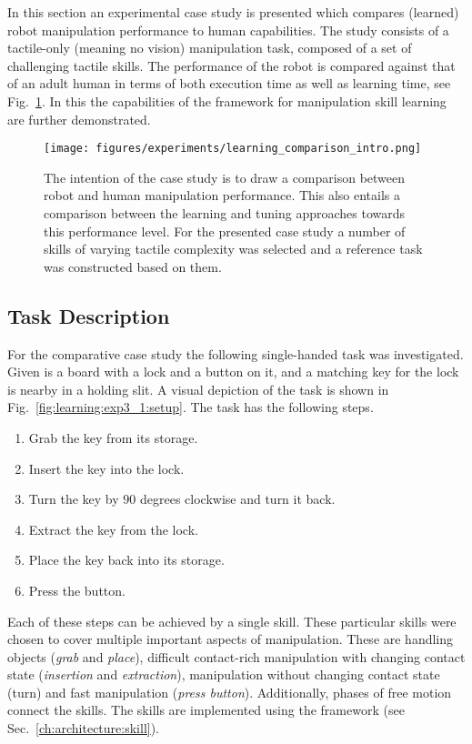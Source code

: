 In this section an experimental case study is presented which compares (learned) robot manipulation performance to human capabilities.
The study consists of a tactile-only (meaning no vision) manipulation task, composed of a set of challenging tactile skills.
The performance of the robot is compared against that of an adult human in terms of both execution time as well as learning time, see Fig.~\ref{fig:learning:comparison_intro}.
In this the capabilities of the \skillmodelabbr{} framework for manipulation skill learning are further demonstrated.

\begin{figure}[ht!]
\texttt{[image: figures/experiments/learning\_comparison\_intro.png]}
\caption{The intention of the case study is to draw a comparison between robot and human manipulation performance.
This also entails a comparison between the learning and tuning approaches towards this performance level.
For the presented case study a number of skills of varying tactile complexity was selected and a reference task was constructed based on them.}
\label{fig:learning:comparison_intro}
\end{figure}

\subsection{Task Description}\label{ch:learning:comparison:task}

For the comparative case study the following single-handed task was investigated.
Given is a board with a lock and a button on it, and a matching key for the lock is nearby in a holding slit.
A visual depiction of the task is shown in Fig.~\ref{fig:learning:exp3_1:setup}.
The task has the following steps.
\begin{enumerate}
\item Grab the key from its storage.
\item Insert the key into the lock.
\item Turn the key by $90$ degrees clockwise and turn it back.
\item Extract the key from the lock.
\item Place the key back into its storage.
\item Press the button.
\end{enumerate}

Each of these steps can be achieved by a single skill.
These particular skills were chosen to cover multiple important aspects of manipulation.
These are handling objects (\textit{grab} and \textit{place}), difficult contact-rich manipulation with changing contact state (\textit{insertion} and \textit{extraction}), manipulation without changing contact state (turn) and fast manipulation (\textit{press button}).
Additionally, phases of free motion connect the skills.
The skills are implemented using the \skillmodelabbr{} framework (see Sec.~\ref{ch:architecture:skill}).

